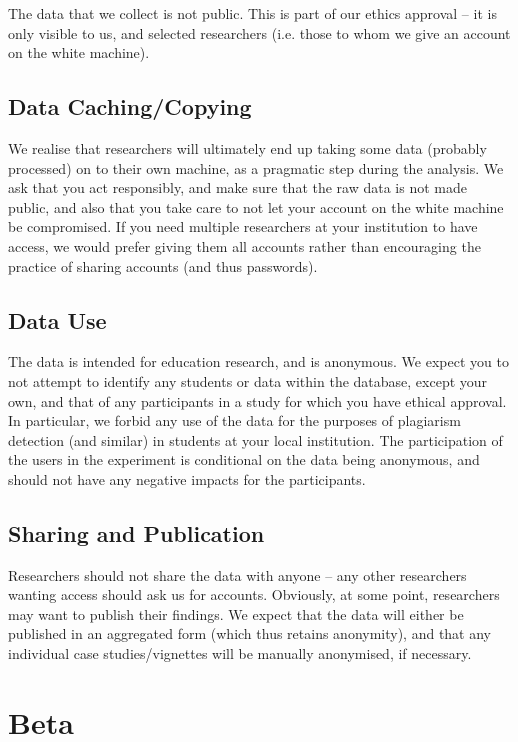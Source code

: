 \documentclass{report}
\begin{document}
The data that we collect is not public.  This is part of our ethics approval
-- it is only visible to us, and selected researchers (i.e. those to whom we
give an account on the white machine).  

\section{Data Caching/Copying}

We realise that researchers will ultimately end up taking some data (probably
processed) on to their own machine, as a pragmatic step during the analysis.
We ask that you act responsibly, and make sure that the raw data is not made
public, and also that you take care to not let your account on the white
machine be compromised.  If you need multiple researchers at your institution
to have access, we would prefer giving them all accounts rather than
encouraging the practice of sharing accounts (and thus passwords).


\section{Data Use}

The data is intended for education research, and is anonymous.  We expect you
to not attempt to identify any students or data within the database, except
your own, and that of any participants in a study for which you have ethical
approval.  In particular, we forbid any use of the data for the purposes of
plagiarism detection (and similar) in students at your local institution.  The
participation of the users in the experiment is conditional on the data being
anonymous, and should not have any negative impacts for the participants.

\section{Sharing and Publication}

Researchers should not share the data with anyone -- any other researchers
wanting access should ask us for accounts.  Obviously, at some point,
researchers may want to publish their findings.  We expect that the data will
either be published in an aggregated form (which thus retains anonymity), and
that any individual case studies/vignettes will be manually anonymised, if
necessary.

\chapter{Beta}
\end{document}
